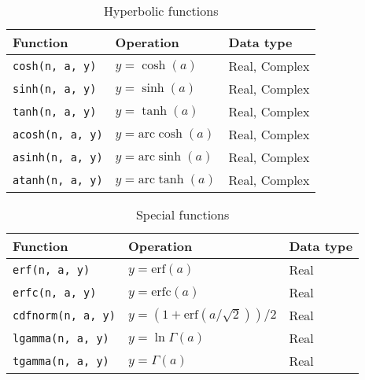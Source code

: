 \begin{table}
  \begin{tabularx}{\textwidth}{LLL}
    \toprule
    Function & Operation & Data type \\
    \midrule
    \texttt{cosh(n, a, y)}  & $y = \cosh(a)$             & Real, Complex \\
    \texttt{sinh(n, a, y)}  & $y = \sinh(a)$             & Real, Complex \\
    \texttt{tanh(n, a, y)}  & $y = \tanh(a)$             & Real, Complex \\
    \texttt{acosh(n, a, y)} & $y = \mathrm{arc}\cosh(a)$ & Real, Complex \\
    \texttt{asinh(n, a, y)} & $y = \mathrm{arc}\sinh(a)$ & Real, Complex \\
    \texttt{atanh(n, a, y)} & $y = \mathrm{arc}\tanh(a)$ & Real, Complex \\
    \bottomrule
  \end{tabularx}
  \caption{Hyperbolic functions}
  \label{tab:Hyperbolic functions}
\end{table}

\begin{table}
  \begin{tabularx}{\textwidth}{LLL}
    \toprule
    Function & Operation & Data type \\
    \midrule
    \texttt{erf(n, a, y)}     & $y = \mathrm{erf}(a)$  & Real \\
    \texttt{erfc(n, a, y)}    & $y = \mathrm{erfc}(a)$ & Real \\
    \texttt{cdfnorm(n, a, y)} & $y = (1 + \mathrm{erf}(a / \sqrt{2})) / 2$
    & Real \\
    \texttt{lgamma(n, a, y)}  & $y = \ln\Gamma(a)$     & Real \\
    \texttt{tgamma(n, a, y)}  & $y = \Gamma(a)$        & Real \\
    \bottomrule
  \end{tabularx}
  \caption{Special functions}
  \label{tab:Special functions}
\end{table}

